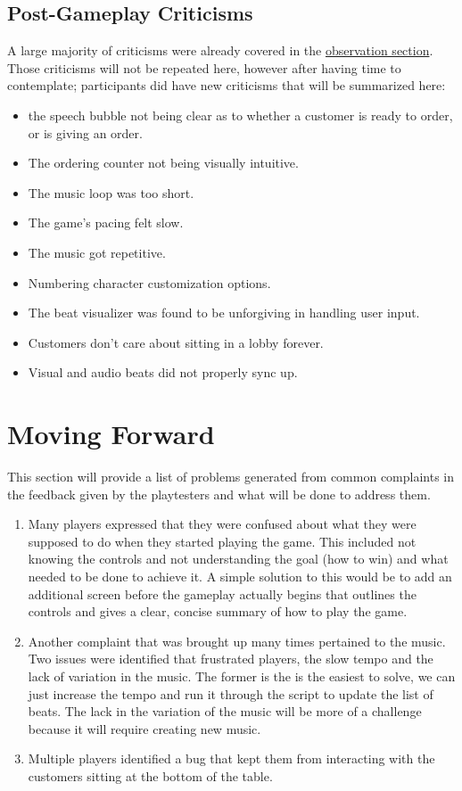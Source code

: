 \documentclass[twoside,twocolumn]{article}
\begin{document}
\subsection{Post-Gameplay Criticisms}
A large majority of criticisms were already covered in the \hyperlink{section.3}{observation section}. Those
criticisms will not be repeated here, however after having time to contemplate; participants did
have new criticisms that will be summarized here:
\begin{itemize}
    \item the speech bubble not being clear as to whether a customer is ready to order, or is giving an order.
    \item The ordering counter not being visually intuitive.
    \item The music loop was too short.
    \item The game's pacing felt slow.
    \item The music got repetitive.
    \item Numbering character customization options.
    \item The beat visualizer was found to be unforgiving in handling user input.
    \item Customers don't care about sitting in a lobby forever.
    \item Visual and audio beats did not properly sync up.
\end{itemize}
\section{Moving Forward}
This section will provide a list of problems generated from common complaints in the feedback given
by the playtesters and what will be done to address them.
\begin{enumerate}
    \item Many players expressed that they were confused about what they were supposed to do when they started playing the game. This included not knowing the controls and not understanding the goal (how to win) and what needed to be done to achieve it. A simple solution to this would be to add an additional screen before the gameplay actually begins that outlines the controls and gives a clear, concise summary of how to play the game.
    \item Another complaint that was brought up many times pertained to the music. Two issues were identified that frustrated players, the slow tempo and the lack of variation in the music. The former is the is the easiest to solve, we can just increase the tempo and run it through the script to update the list of beats. The lack in the variation of the music will be more of a challenge because it will require creating new music.
    \item Multiple players identified a bug that kept them from interacting with the customers sitting at the bottom of the table. 
\end{enumerate}
\end{document}
